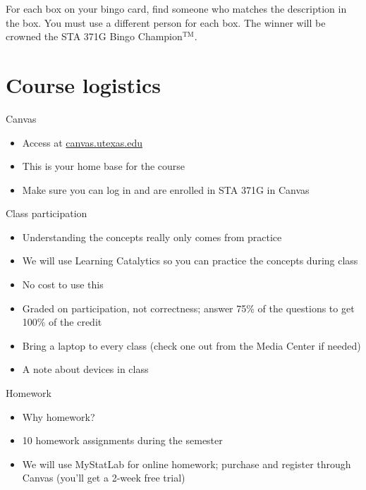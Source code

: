 \documentclass{beamer}\usepackage[]{graphicx}\usepackage[]{color}
\begin{document}
\begin{darkframes}
    \begin{frame}{}
      \begin{center}
        For each box on your bingo card, find someone who matches the description in the box. You must use a different person for each box.
        \vfill
        The winner will be crowned the STA 371G Bingo Champion$^{\text{TM}}$.
      \end{center}
    \end{frame}

    \section{Course logistics}

    \begin{frame}{Canvas}
      \begin{itemize}
        \item Access at \url{canvas.utexas.edu}
        \item This is your home base for the course
        \item Make sure you can log in and are enrolled in STA 371G in Canvas
      \end{itemize}
    \end{frame}

    \begin{frame}{Class participation}
      \begin{itemize}
        \item Understanding the concepts really only comes from practice
        \item We will use \alert{Learning Catalytics} so you can practice the concepts during class
        \item No cost to use this
        \item Graded on participation, not correctness; answer 75\% of the questions to get 100\% of the credit
        \item Bring a laptop to every class (check one out from the Media Center if needed)
        \item A note about devices in class
      \end{itemize}
    \end{frame}


    \begin{frame}{Homework}
      \begin{itemize}
        \item Why homework?
        \item 10 homework assignments during the semester
        \item We will use \alert{MyStatLab} for online homework; purchase and register through Canvas (you'll get a 2-week free trial)
      \end{itemize}
    \end{frame}



\end{darkframes}
\end{document}
